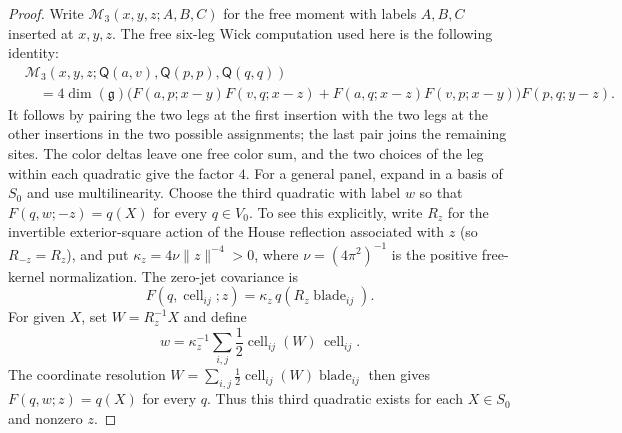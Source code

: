 \begin{proof}
Write $\mathcal M_3(x,y,z;A,B,C)$ for the free moment with labels
$A,B,C$ inserted at $x,y,z$.  The free six-leg Wick computation used here
is the following identity:
\begin{equation}
\begin{split}
&\mathcal M_3(x,y,z;\mathsf Q(a,v),\mathsf Q(p,p),\mathsf Q(q,q))\\
&\quad=4\dim(\mathfrak g)\bigl(F(a,p;x-y)F(v,q;x-z)
 +F(a,q;x-z)F(v,p;x-y)\bigr)F(p,q;y-z).
\end{split}
\label{eq:free-three-quadratic-wick}
\end{equation}
It follows by pairing the two legs at the first insertion with the two
legs at the other insertions in the two possible assignments; the last
pair joins the remaining sites.  The color deltas leave one free color
sum, and the two choices of the leg within each quadratic give the factor
$4$.  For a general panel, expand in a basis of $S_0$ and use
multilinearity.  Choose the third quadratic with label $w$ so that
$F(q,w;-z)=q(X)$ for every $q\in V_0$.  To see this explicitly, write
$R_z$ for the invertible exterior-square action of the House reflection
associated with $z$ (so $R_{-z}=R_z$), and put
$\kappa_z=4\nu\lVert z\rVert^{-4}>0$, where $\nu=(4\pi^2)^{-1}$ is the positive
free-kernel normalization.  The zero-jet covariance is
\[
 F(q,\operatorname{cell}_{ij};z)=\kappa_z\,q(R_z\operatorname{blade}_{ij}).
\]
For given $X$, set $W=R_z^{-1}X$ and define
\[
 w=\kappa_z^{-1}\sum_{i,j}\frac12
   \operatorname{cell}_{ij}(W)\,\operatorname{cell}_{ij}.
\]
The coordinate resolution
$W=\sum_{i,j}\frac12\operatorname{cell}_{ij}(W)\operatorname{blade}_{ij}$
then gives $F(q,w;z)=q(X)$ for every $q$.  Thus this third quadratic
exists for each $X\in S_0$ and nonzero $z$.


\end{proof}
